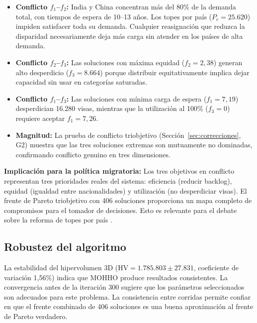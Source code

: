 \documentclass[12pt,letterpaper]{article}
\begin{document}
\begin{itemize}
    \item \textbf{Conflicto $f_1$--$f_2$:} India y China concentran más del 80\% de la demanda total, con tiempos de espera de 10--13 años. Los topes por país ($P_c = 25.620$) impiden satisfacer toda su demanda. Cualquier reasignación que reduzca la disparidad necesariamente deja más carga sin atender en los países de alta demanda.

    \item \textbf{Conflicto $f_2$--$f_3$:} Las soluciones con máxima equidad ($f_2 = 2{,}38$) generan alto desperdicio ($f_3 = 8.664$) porque distribuir equitativamente implica dejar capacidad sin usar en categorías saturadas.

    \item \textbf{Conflicto $f_1$--$f_3$:} Las soluciones con mínima carga de espera ($f_1 = 7{,}19$) desperdician 16.280 visas, mientras que la utilización al 100\% ($f_3 = 0$) requiere aceptar $f_1 = 7{,}26$.

    \item \textbf{Magnitud:} La prueba de conflicto triobjetivo (Sección~\ref{sec:correcciones}, G2) muestra que las tres soluciones extremas son mutuamente no dominadas, confirmando conflicto genuino en tres dimensiones.
\end{itemize}

\begin{yellowbox}
\textbf{Implicación para la política migratoria:} Los tres objetivos en conflicto representan tres prioridades reales del sistema: eficiencia (reducir backlog), equidad (igualdad entre nacionalidades) y utilización (no desperdiciar visas). El frente de Pareto triobjetivo con 406 soluciones proporciona un mapa completo de compromisos para el tomador de decisiones. Esto es relevante para el debate sobre la reforma de topes por país \parencite{fwd2024, crs2023}.
\end{yellowbox}

\subsection{Robustez del algoritmo}

La estabilidad del hipervolumen 3D ($\text{HV} = 1.785.803 \pm 27.831$, coeficiente de variación 1{,}56\%) indica que MOHHO produce resultados consistentes. La convergencia antes de la iteración 300 sugiere que los parámetros seleccionados son adecuados para este problema. La consistencia entre corridas permite confiar en que el frente combinado de 406 soluciones es una buena aproximación al frente de Pareto verdadero.
\end{document}
